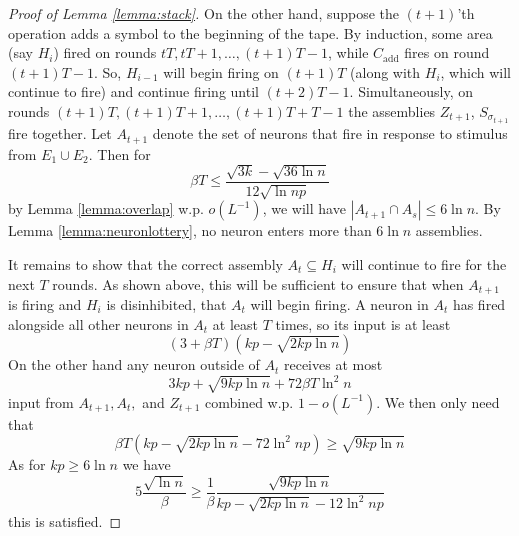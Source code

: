 \documentclass[12pt,nosubfloats]{alt2024} %
\newcommand{\1}{\mathbbm{1}}
\begin{document}
\begin{proof}[Proof of Lemma \ref{lemma:stack}]
On the other hand, suppose the $(t+1)$'th operation adds a symbol to the beginning of the tape. By induction, some area (say $H_i$) fired on rounds $tT, tT+1, \ldots, (t+1)T - 1$, while $C_{\text{add}}$ fires on round $(t+1)T - 1$. So, $H_{i-1}$ will begin firing on $(t+1)T$ (along with $H_i$, which will continue to fire) and continue firing until $(t+2)T - 1$. Simultaneously, on rounds $(t+1)T, (t+1)T + 1, \ldots, (t+1)T + T - 1$ the assemblies $Z_{t+1}$, $S_{\sigma_{t+1}}$ fire together. Let $A_{t+1}$ denote the set of neurons that fire in response to stimulus from $E_1 \cup E_2$. Then for
\[\beta T \le \frac{\sqrt{3k} - \sqrt{36 \ln n}}{12 \sqrt{\ln n p}}\]
by Lemma \ref{lemma:overlap} w.p. $o(L^{-1})$, we will have $|A_{t+1} \cap A_s| \le 6 \ln n$. By Lemma \ref{lemma:neuronlottery}, no neuron enters more than $6 \ln n$ assemblies.

It remains to show that the correct assembly $A_t \subseteq H_i$ will continue to fire for the next $T$ rounds. As shown above, this will be sufficient to ensure that when $A_{t+1}$ is firing and $H_i$ is disinhibited, that $A_t$ will begin firing. A neuron in $A_t$ has fired alongside all other neurons in $A_t$ at least $T$ times, so its input is at least
\[\left(3 + \beta T\right) \left(kp - \sqrt{2kp \ln n}\right)\]
On the other hand any neuron outside of $A_t$ receives at most
\[3kp + \sqrt{9kp \ln n} + 72 \beta T \ln^2 n\]
input from $A_{t+1}, A_t,$ and $Z_{t+1}$ combined w.p. $1 - o(L^{-1})$. We then only need that
\[\beta T \left(kp - \sqrt{2kp \ln n} - 72 \ln^2 n p\right) \ge \sqrt{9kp \ln n}\]
As for $kp \ge 6\ln n$ we have
\[5\frac{\sqrt{\ln n}}{\beta} \ge \frac{1}{\beta}\frac{\sqrt{9kp \ln n}}{kp - \sqrt{2kp \ln n} - 12 \ln^2 n p}\]
this is satisfied.

\end{proof}
\end{document}
